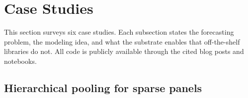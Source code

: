 \documentclass[11pt,3p,review,authoryear]{elsarticle}
\begin{document}
\section{Case Studies}
\label{sec:cases}

This section surveys six case studies. Each subsection states the forecasting problem, the modeling idea, and what the substrate enables that off-the-shelf libraries do not. All code is publicly available through the cited blog posts and notebooks.

\subsection{Hierarchical pooling for sparse panels}
\label{sec:hier}
\end{document}
